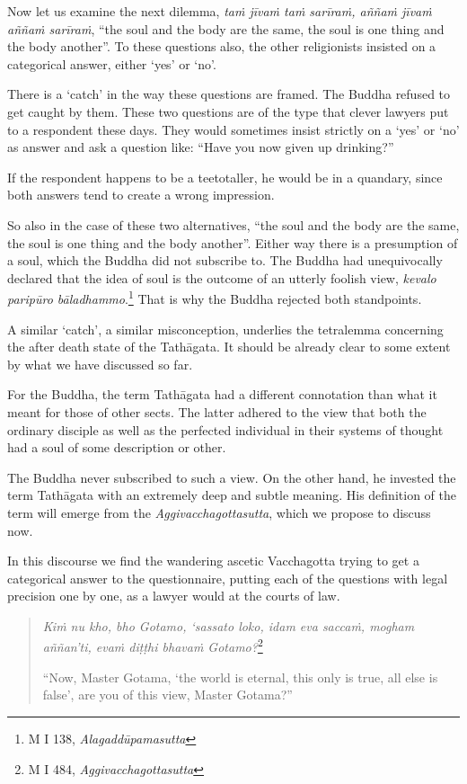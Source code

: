 Now let us examine the next dilemma, \emph{taṁ jīvaṁ taṁ sarīraṁ, aññaṁ jīvaṁ aññaṁ sarīraṁ}, ``the soul and the body are the same, the soul is one thing and the body another''. To these questions also, the other religionists insisted on a categorical answer, either `yes' or `no'.

There is a `catch' in the way these questions are framed. The Buddha refused to get caught by them. These two questions are of the type that clever lawyers put to a respondent these days. They would sometimes insist strictly on a `yes' or `no' as answer and ask a question like: ``Have you now given up drinking?''

If the respondent happens to be a teetotaller, he would be in a quandary, since both answers tend to create a wrong impression.

So also in the case of these two alternatives, ``the soul and the body are the same, the soul is one thing and the body another''. Either way there is a presumption of a soul, which the Buddha did not subscribe to. The Buddha had unequivocally declared that the idea of soul is the outcome of an utterly foolish view, \emph{kevalo paripūro bāladhammo}.\footnote{M I 138, \emph{Alagaddūpamasutta}} That is why the Buddha rejected both standpoints.

A similar `catch', a similar misconception, underlies the tetralemma concerning the after death state of the Tathāgata. It should be already clear to some extent by what we have discussed so far.

For the Buddha, the term Tathāgata had a different connotation than what it meant for those of other sects. The latter adhered to the view that both the ordinary disciple as well as the perfected individual in their systems of thought had a soul of some description or other.

The Buddha never subscribed to such a view. On the other hand, he invested the term Tathāgata with an extremely deep and subtle meaning. His definition of the term will emerge from the \emph{Aggivacchagottasutta}, which we propose to discuss now.

In this discourse we find the wandering ascetic Vacchagotta trying to get a categorical answer to the questionnaire, putting each of the questions with legal precision one by one, as a lawyer would at the courts of law.

\begin{quote}
\emph{Kiṁ nu kho, bho Gotamo, `sassato loko, idam eva saccaṁ, mogham aññan'ti, evaṁ diṭṭhi bhavaṁ Gotamo?}\footnote{M I 484, \emph{Aggivacchagottasutta}}

``Now, Master Gotama, `the world is eternal, this only is true, all else is false', are you of this view, Master Gotama?''
\end{quote}

